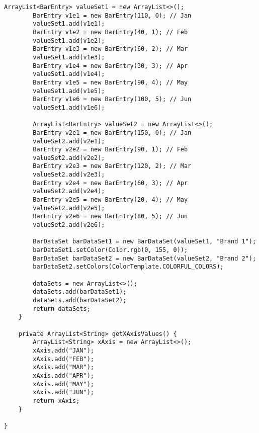 \documentclass[12pt,a4paper]{article}
\begin{document}
\begin{lstlisting}[caption=./mobile/src/main/java/app/transparenciaeducativa/GraficosActivity.java]
        ArrayList<BarEntry> valueSet1 = new ArrayList<>();
        BarEntry v1e1 = new BarEntry(110, 0); // Jan
        valueSet1.add(v1e1);
        BarEntry v1e2 = new BarEntry(40, 1); // Feb
        valueSet1.add(v1e2);
        BarEntry v1e3 = new BarEntry(60, 2); // Mar
        valueSet1.add(v1e3);
        BarEntry v1e4 = new BarEntry(30, 3); // Apr
        valueSet1.add(v1e4);
        BarEntry v1e5 = new BarEntry(90, 4); // May
        valueSet1.add(v1e5);
        BarEntry v1e6 = new BarEntry(100, 5); // Jun
        valueSet1.add(v1e6);

        ArrayList<BarEntry> valueSet2 = new ArrayList<>();
        BarEntry v2e1 = new BarEntry(150, 0); // Jan
        valueSet2.add(v2e1);
        BarEntry v2e2 = new BarEntry(90, 1); // Feb
        valueSet2.add(v2e2);
        BarEntry v2e3 = new BarEntry(120, 2); // Mar
        valueSet2.add(v2e3);
        BarEntry v2e4 = new BarEntry(60, 3); // Apr
        valueSet2.add(v2e4);
        BarEntry v2e5 = new BarEntry(20, 4); // May
        valueSet2.add(v2e5);
        BarEntry v2e6 = new BarEntry(80, 5); // Jun
        valueSet2.add(v2e6);

        BarDataSet barDataSet1 = new BarDataSet(valueSet1, "Brand 1");
        barDataSet1.setColor(Color.rgb(0, 155, 0));
        BarDataSet barDataSet2 = new BarDataSet(valueSet2, "Brand 2");
        barDataSet2.setColors(ColorTemplate.COLORFUL_COLORS);

        dataSets = new ArrayList<>();
        dataSets.add(barDataSet1);
        dataSets.add(barDataSet2);
        return dataSets;
    }

    private ArrayList<String> getXAxisValues() {
        ArrayList<String> xAxis = new ArrayList<>();
        xAxis.add("JAN");
        xAxis.add("FEB");
        xAxis.add("MAR");
        xAxis.add("APR");
        xAxis.add("MAY");
        xAxis.add("JUN");
        return xAxis;
    }

}
\end{lstlisting}
\pagebreak
\end{document}
